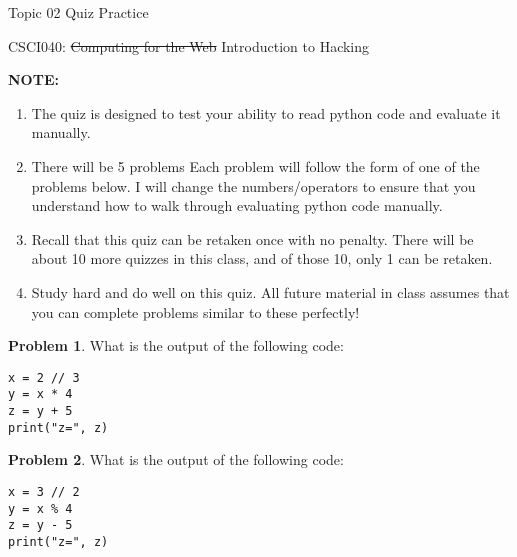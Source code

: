 \documentclass[10pt]{article}
\theoremstyle{definition}
\newtheorem{problem}{Problem}
\begin{document}
\begin{center}
    {
\Large
    Topic 02 Quiz Practice
}

    \vspace{0.1in}
    CSCI040: \sout{Computing for the Web} Introduction to Hacking

    \vspace{0.1in}
\end{center}

\noindent
\textbf{NOTE:}
\begin{enumerate}
\item
The quiz is designed to test your ability to read python code and evaluate it manually.
\item
There will be 5 problems
Each problem will follow the form of one of the problems below.
I will change the numbers/operators to ensure that you understand how to walk through evaluating python code manually.
\item
Recall that this quiz can be retaken once with no penalty.
There will be about 10 more quizzes in this class,
and of those 10, only 1 can be retaken.
\item
Study hard and do well on this quiz.
All future material in class assumes that you can complete problems similar to these perfectly!
\end{enumerate}
\vspace{0.15in}

\begin{problem}
    What is the output of the following code:
\end{problem}
\begin{lstlisting}
x = 2 // 3
y = x * 4
z = y + 5
print("z=", z)
\end{lstlisting}
\vspace{1.5in}

\begin{problem}
    What is the output of the following code:
\end{problem}
\begin{lstlisting}
x = 3 // 2
y = x % 4
z = y - 5
print("z=", z)
\end{lstlisting}
\vspace{1.5in}

\end{document}
